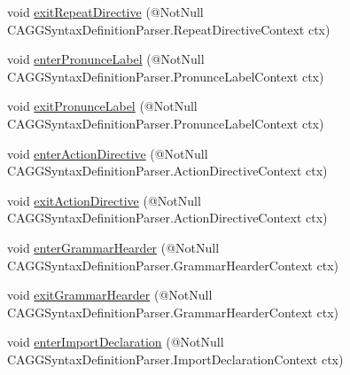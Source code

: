 \begin{DoxyCompactItemize}
\item 
void \hyperlink{classit_1_1emarolab_1_1cagg_1_1core_1_1language_1_1parser_1_1ANTLRInterface_1_1ANTLRGenerated_1_1a45b55289931e185944c10a916c8cdd_af0eada26e134feecaadeb22d6eac1f72}{exit\-Repeat\-Directive} (@Not\-Null C\-A\-G\-G\-Syntax\-Definition\-Parser.\-Repeat\-Directive\-Context ctx)
\item 
void \hyperlink{classit_1_1emarolab_1_1cagg_1_1core_1_1language_1_1parser_1_1ANTLRInterface_1_1ANTLRGenerated_1_1a45b55289931e185944c10a916c8cdd_ab576748bce9058397eb9bf224783fc2f}{enter\-Pronunce\-Label} (@Not\-Null C\-A\-G\-G\-Syntax\-Definition\-Parser.\-Pronunce\-Label\-Context ctx)
\item 
void \hyperlink{classit_1_1emarolab_1_1cagg_1_1core_1_1language_1_1parser_1_1ANTLRInterface_1_1ANTLRGenerated_1_1a45b55289931e185944c10a916c8cdd_a51821e5ebf7c07dde10929ac41084ef9}{exit\-Pronunce\-Label} (@Not\-Null C\-A\-G\-G\-Syntax\-Definition\-Parser.\-Pronunce\-Label\-Context ctx)
\item 
void \hyperlink{classit_1_1emarolab_1_1cagg_1_1core_1_1language_1_1parser_1_1ANTLRInterface_1_1ANTLRGenerated_1_1a45b55289931e185944c10a916c8cdd_aa402de9aaf41853b3f23eea026dc46ef}{enter\-Action\-Directive} (@Not\-Null C\-A\-G\-G\-Syntax\-Definition\-Parser.\-Action\-Directive\-Context ctx)
\item 
void \hyperlink{classit_1_1emarolab_1_1cagg_1_1core_1_1language_1_1parser_1_1ANTLRInterface_1_1ANTLRGenerated_1_1a45b55289931e185944c10a916c8cdd_a8cf692c6e06ed5fb503c5c72a4049a2a}{exit\-Action\-Directive} (@Not\-Null C\-A\-G\-G\-Syntax\-Definition\-Parser.\-Action\-Directive\-Context ctx)
\item 
void \hyperlink{classit_1_1emarolab_1_1cagg_1_1core_1_1language_1_1parser_1_1ANTLRInterface_1_1ANTLRGenerated_1_1a45b55289931e185944c10a916c8cdd_aababd12a8beb26cc4de55d9fd7aeed39}{enter\-Grammar\-Hearder} (@Not\-Null C\-A\-G\-G\-Syntax\-Definition\-Parser.\-Grammar\-Hearder\-Context ctx)
\item 
void \hyperlink{classit_1_1emarolab_1_1cagg_1_1core_1_1language_1_1parser_1_1ANTLRInterface_1_1ANTLRGenerated_1_1a45b55289931e185944c10a916c8cdd_a495b2452e0c15d42175abcdfa25e775b}{exit\-Grammar\-Hearder} (@Not\-Null C\-A\-G\-G\-Syntax\-Definition\-Parser.\-Grammar\-Hearder\-Context ctx)
\item 
void \hyperlink{classit_1_1emarolab_1_1cagg_1_1core_1_1language_1_1parser_1_1ANTLRInterface_1_1ANTLRGenerated_1_1a45b55289931e185944c10a916c8cdd_a1eaa774a659e826d256fd3d96eb34a26}{enter\-Import\-Declaration} (@Not\-Null C\-A\-G\-G\-Syntax\-Definition\-Parser.\-Import\-Declaration\-Context ctx)

\end{DoxyCompactItemize}

